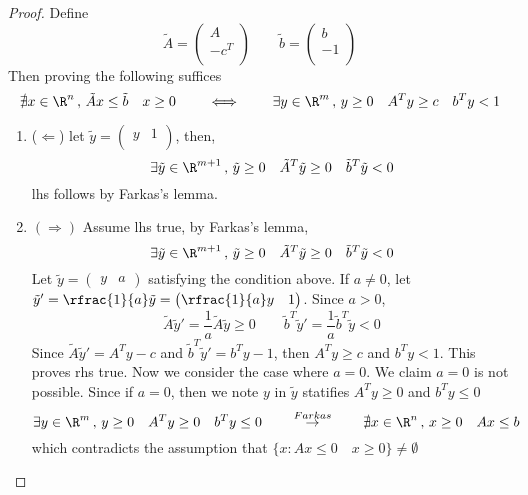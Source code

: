 \documentclass[11pt]{article}
\begin{document}
\begin{enumerate}
\begin{proof}
        Define 
        \[
            \tilde{A} =
            \begin{pmatrix}
                A \\
                -c^T \\
            \end{pmatrix}    
            \qquad 
            \tilde{b} = 
            \begin{pmatrix}
                b \\ 
                -1 \\ 
            \end{pmatrix}
        \]
        Then proving the following suffices
        \[
            \nexists x\in\R^n \, ,\, \tilde{A}x \leq \tilde{b} \quad x \geq 0
            \qquad \iff \qquad 
            \exists y \in\R^m \, ,\, y \geq 0 \quad A^T y \geq c \quad b^T y < 1
        \]
        \begin{enumerate}
            \item ($\Leftarrow$) let $\tilde{y} = \begin{pmatrix} y & 1 \\ \end{pmatrix}$, then, 
            \[
                \exists \tilde{y} \in\R^{m+1} \, ,\, \tilde{y} \geq 0 \quad \tilde{A}^T \tilde{y} \geq 0 \quad \tilde{b}^T \tilde{y} < 0
            \]
            lhs follows by Farkas's lemma.
            \item $(\Rightarrow)$ Assume lhs true, by Farkas's lemma, 
            \[
                \exists \tilde{y} \in\R^{m+1} \, ,\, \tilde{y} \geq 0 \quad \tilde{A}^T \tilde{y} \geq 0 \quad \tilde{b}^T \tilde{y} < 0 
            \]
            Let $\tilde{y} = \begin{pmatrix} y & a \end{pmatrix}$ satisfying the condition above. If $a\neq 0$, let $\tilde{y}' = \rfrac{1}{a} \tilde{y} = \begin{pmatrix} \rfrac{1}{a} y & 1 \end{pmatrix}$. Since $a > 0$,
            \[
                \tilde{A} \tilde{y}' = \frac{1}{a} \tilde{A}\tilde{y} \geq 0 
                \qquad 
                \tilde{b}^T \tilde{y}' = \frac{1}{a} \tilde{b}^T \tilde{y} < 0 
            \]
            Since $\tilde{A} \tilde{y}' = A^T y  - c$ and $\tilde{b}^T \tilde{y}' = b^T y - 1$, then $A^T y \geq c$ and $b^T y < 1$. This proves rhs true. Now we consider the case where $a=0$. We claim $a=0$ is not possible. Since if $a=0$, then we note $y$ in $\tilde{y}$ statifies $ A^T y \geq 0$ and $b^T y \leq 0$
            \[
                \exists y\in\R^m \, ,\, y\geq 0 \quad A^T y \geq 0 \quad b^T y \leq 0
                \qquad \overset{Farkas}{\rightarrow} \qquad 
                \nexists x\in \R^n \, ,\, x \geq 0 \quad Ax \leq b
            \]
            which contradicts the assumption that $\{x: Ax\leq 0 \quad x\geq 0\} \neq \emptyset$
        \end{enumerate}
    \end{proof}
\end{enumerate}
\end{document}
